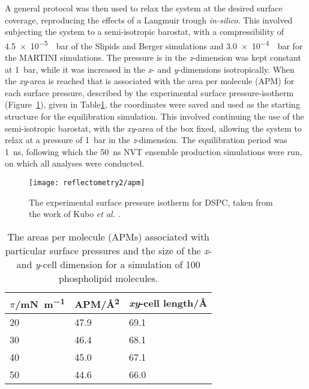 A general protocol was then used to relax the system at the desired surface coverage, reproducing the effects of a Langmuir trough \emph{in-silico}.
This involved subjecting the system to a semi-isotropic barostat, with a compressibility of \SI{4.5e-5}{\per\bar} of the Slipids and Berger simulations and \SI{3.0e-4}{\per\bar} for the MARTINI simulations.
The pressure is in the \emph{z}-dimension was kept constant at \SI{1}{\bar}, while it was increased in the \emph{x}- and \emph{y}-dimensions isotropically.
When the \emph{xy}-area is reached that is associated with the area per molecule (APM) for each surface pressure, described by the experimental surface pressure-isotherm (Figure~\ref{fig:surfiso}), given in Table\ref{tab:apm}, the coordinates were saved and used as the starting structure for the equilibration simulation.
This involved continuing the use of the semi-isotropic barostat, with the \emph{xy}-area of the box fixed, allowing the system to relax at a pressure of \SI{1}{\bar} in the \emph{z}-dimension.
The equilibration period was \SI{1}{\nano\second}, following which the \SI{50}{\nano\second} NVT ensemble production simulations were run, on which all analyses were conducted.
%
\begin{figure}
    \centering
    \texttt{[image: reflectometry2/apm]}
    \caption{The experimental surface pressure isotherm for DSPC, taken from the work of Kubo \emph{et al.} \cite{kubo_phosphatidylcholine_2001}.}
    \label{fig:surfiso}
\end{figure}
%
%
\begin{table}
    \centering
    \small
    \caption{The areas per molecule (APMs) associated with particular surface pressures and the size of the \emph{x}- and \emph{y}-cell dimension for a simulation of 100 phospholipid molecules.}
    \label{tab:apm}
    \begin{tabular}{l | l l}
        \toprule
        $\pi$/\si{\milli\newton\per\meter} & APM/\si{\angstrom\squared} & \emph{xy}-cell length/\si{\angstrom} \\
        \midrule
        \num{20} & \num{47.9} & \num{69.1} \\
        \num{30} & \num{46.4} & \num{68.1} \\
        \num{40} & \num{45.0} & \num{67.1} \\
        \num{50} & \num{44.6} & \num{66.0} \\
        \bottomrule
    \end{tabular}
\end{table}
%

